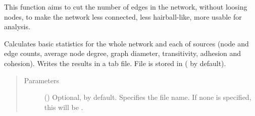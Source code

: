 \documentclass[letterpaper,10pt,english]{sphinxmanual}
\begin{document}
\begin{fulllineitems}

\begin{fulllineitems}
\label{\detokenize{main:pypath.main.PyPath.neighbors}}
\end{fulllineitems}


\begin{fulllineitems}
\label{\detokenize{main:pypath.main.PyPath.neighbourhood_network}}
\end{fulllineitems}


\begin{fulllineitems}
\label{\detokenize{main:pypath.main.PyPath.network_filter}}
This function aims to cut the number of edges in the network,
without loosing nodes, to make the network less connected,
less hairball-like, more usable for analysis.

\end{fulllineitems}


\begin{fulllineitems}
\label{\detokenize{main:pypath.main.PyPath.network_stats}}
Calculates basic statistics for the whole network and each of
sources (node and edge counts, average node degree, graph
diameter, transitivity, adhesion and cohesion). Writes the
results in a tab file. File is stored in
 ( by default).
\begin{quote}\begin{description}
\item[{Parameters}] \leavevmode
{} () \textendash{} Optional,  by default. Specifies the file name. If
none is specified, this will be .


\end{description}
\end{quote}
\end{fulllineitems}
\end{fulllineitems}
\end{document}
